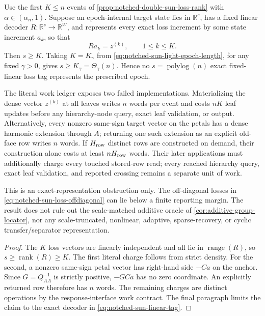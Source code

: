 \begin{corollary}
\label{cor:notched-sun-exact-tag-obstruction}
Use the first $K\leq n$ events of
\cref{prop:notched-double-sun-loss-rank} with
$\alpha\in(\alpha_n,1)$.  Suppose an epoch-internal target state lies in
$\mathbb R^s$, has a fixed linear decoder
$R:\mathbb R^s\to\mathbb R^W$, and represents every exact loss increment by
some state increment $a_k$, so that
\begin{equation}
 Ra_k=z^{(k)},
 \qquad 1\leq k\leq K.
 \label{eq:notched-sun-linear-tag}
\end{equation}
Then $s\geq K$.  Taking $K=K_\gamma$ from
\cref{eq:notched-sun-light-epoch-length}, for any fixed $\gamma>0$, gives
$s\geq K_\gamma=\Theta_\gamma(n)$.  Hence no
$s=\operatorname{polylog}(n)$ exact fixed-linear loss tag represents the
prescribed epoch.

The literal work ledger exposes two failed implementations.  Materializing
the dense vector $z^{(k)}$ at all leaves writes $n$ words per event and costs
$nK$ leaf updates before any hierarchy-node query, exact leaf validation, or
output.  Alternatively, every nonzero same-sign target vector on the petals
has a dense harmonic extension through $A$; returning one such extension as
an explicit old-face row writes $n$ words.  If $H_{\rm row}$ distinct rows are
constructed on demand, their construction alone costs at least
$nH_{\rm row}$ words.  Their later applications must additionally charge
every touched stored-row read; every reached hierarchy query, exact leaf
validation, and reported crossing remains a separate unit of work.

This is an exact-representation obstruction only.  The off-diagonal losses in
\cref{eq:notched-sun-loss-offdiagonal} can lie below a finite reporting
margin.  The result does not rule out the scale-matched additive oracle of
\cref{cor:additive-group-locator}, nor any scale-truncated, nonlinear,
adaptive, sparse-recovery, or cyclic transfer/separator representation.
\end{corollary}

\begin{proof}
The $K$ loss vectors are linearly independent and all lie in
$\operatorname{range}(R)$, so
$s\geq\operatorname{rank}(R)\geq K$.
The first literal charge follows from strict density.  For the second, a
nonzero same-sign petal vector has right-hand side $-Ca$ on the anchor.
Since $G=Q_{AA}^{-1}$ is strictly positive, $-GCa$ has no zero coordinate.
An explicitly returned row therefore has $n$ words.  The remaining charges
are distinct operations by the response-interface work contract.  The final
paragraph limits the claim to the exact decoder in
\cref{eq:notched-sun-linear-tag}.
\end{proof}

